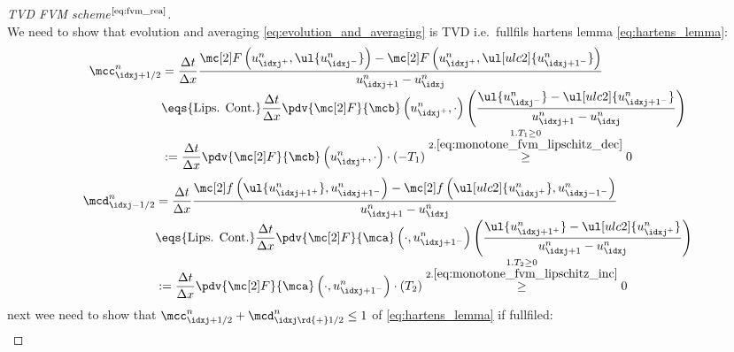 \begin{proofbox}\nospacing
    \begin{proof}[TVD FVM scheme$^{\text{\cref{eq:fvm_rea}}}$]\label{proof:eq:fvm_rea}\leavevmode\\
        We need to show that evolution and averaging \cref{eq:evolution_and_averaging} is TVD i.e.\ fullfils hartens lemma \cref{eq:hartens_lemma}:
        \begin{align*}
          \mcc_{\idxj+1/2}^{n}&=\frac{\Delta t}{\Delta x}\frac{\Flux \left(u_{\idxj^+}^{n},\ul{u_{\idxj^{-}}^{n}}\right)-\Flux \left(u_{\idxj^+}^{n},\ul[ulc2]{u_{\idxj+1^{-}}^{n}}\right)}{u_{\idxj+1}^{n}-u_{\idxj}^{n}}\nonumber\\[-1\jot]
                              &\eqs{\text{Lips. Cont.}}\frac{\Delta t}{\Delta x}\pdv{\Flux}{\mcb}\left(u_{\idxj^{+}}^{n},\cdot\right)
                                \left(\frac{\ul{u_{\idxj^{-}}^{n}}-\ul[ulc2]{u_{\idxj+1^{-}}^{n}}}{u_{\idxj+1}^{n}-u_{\idxj}^{n}}\right)\\[-1\jot]
                              &:=\frac{\Delta t}{\Delta x}\pdv{\Flux}{\mcb}\left(u_{\idxj^{+}}^{n},\cdot\right)\cdot\left(-T_{1}\right)
                          \stackrel{\substack{1. T_{1}\geq0 \\2. \cref{eq:monotone_fvm_lipschitz_dec}}}{\geq}0
        \end{align*}
        \begin{align*}
          \mcd_{\idxj-1/2}^{n}&=\frac{\Delta t}{\Delta x}\frac{\flux \left(\ul{u_{\idxj+1^+}^{n}},u_{\idxj+1^{-}}^{n}\right)-\flux \left(\ul[ulc2]{u_{\idxj^+}^{n}},u_{\idxj-1^{-}}^{n}\right)}{u_{\idxj+1}^{n}-u_{\idxj}^{n}}\nonumber\\[-1\jot]
                              &\eqs{\text{Lips. Cont.}}\frac{\Delta t}{\Delta x}\pdv{\Flux}{\mca}\left(\cdot,u_{\idxj+1^{-}}^{n}\right)
                                \left(\frac{\ul{u_{\idxj+1^{+}}^{n}}-\ul[ulc2]{u_{\idxj^{+}}^{n}}}{u_{\idxj+1}^{n}-u_{\idxj}^{n}}\right)\\[-1\jot]
                              &:=\frac{\Delta t}{\Delta x}\pdv{\Flux}{\mca}\left(\cdot,u_{\idxj+1^{-}}^{n}\right)\cdot\left(T_{2}\right)
                          \stackrel{\substack{1. T_{2}\geq0 \\2. \cref{eq:monotone_fvm_lipschitz_inc}}}{\geq}0
        \end{align*}
        next wee need to show that $\mcc_{\idxj+1/2}^{n}+\mcd_{\idxj\rd{+}1/2}^{n}\leq1$ of \cref{eq:hartens_lemma} if fullfiled:
        \begin{align*}

\end{align*}
\end{proof}
\end{proofbox}
